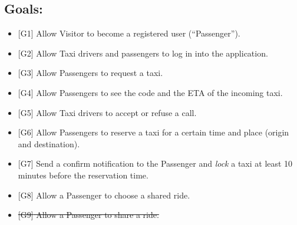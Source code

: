 \subsection{Goals: }
\begin{itemize}
\item {[}G1{]} Allow Visitor to become a registered user (“Passenger”).
\item {[}G2{]} Allow Taxi drivers and passengers to log in into the application.
\item {[}G3{]} Allow Passengers to request a taxi.
\item {[}G4{]} Allow Passengers to see the code and the ETA of the incoming taxi.
\item {[}G5{]} Allow Taxi drivers to accept or refuse a call.
\item {[}G6{]} Allow Passengers to reserve a taxi for a certain time and place (origin and destination).
\item {[}G7{]} Send a confirm notification to the Passenger and \textit{lock} a taxi at least 10 minutes before the reservation time.
\item {[}G8{]} Allow a Passenger to choose a shared ride.
\item \sout{{[}G9{]} Allow a Passenger to share a ride.}
\end{itemize}



